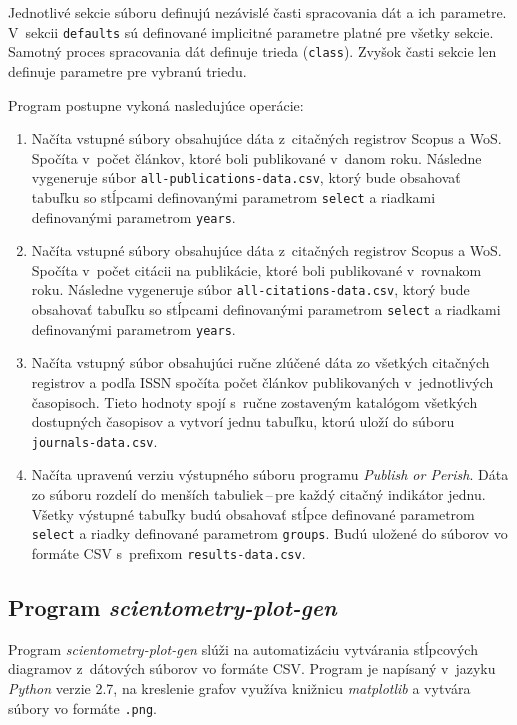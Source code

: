 Jednotlivé sekcie súboru definujú nezávislé časti spracovania dát a ich
parametre. V~sekcii \verb|defaults| sú definované implicitné parametre platné
pre všetky sekcie. Samotný proces spracovania dát definuje trieda
(\verb|class|). Zvyšok časti sekcie len definuje parametre pre vybranú triedu.

Program postupne vykoná nasledujúce operácie:

\begin{enumerate}
\item Načíta vstupné súbory obsahujúce dáta z~citačných registrov Scopus a
  WoS. Spočíta v~počet článkov, ktoré boli publikované v~danom roku. Následne
  vygeneruje súbor \verb|all-publications-data.csv|, ktorý bude obsahovať
  tabuľku so stĺpcami definovanými parametrom \verb|select| a riadkami
  definovanými parametrom \verb|years|.
\item Načíta vstupné súbory obsahujúce dáta z~citačných registrov Scopus a
  WoS. Spočíta v~počet citácii na publikácie, ktoré boli publikované v~rovnakom
  roku. Následne vygeneruje súbor \verb|all-citations-data.csv|, ktorý bude
  obsahovať tabuľku so stĺpcami definovanými parametrom \verb|select| a riadkami
  definovanými parametrom \verb|years|.
\item Načíta vstupný súbor obsahujúci ručne zlúčené dáta zo všetkých citačných
  registrov a podľa ISSN spočíta počet článkov publikovaných v~jednotlivých
  časopisoch. Tieto hodnoty spojí s~ručne zostaveným katalógom všetkých
  dostupných časopisov a vytvorí jednu tabuľku, ktorú uloží do súboru
  \verb|journals-data.csv|.
\item Načíta upravenú verziu výstupného súboru programu \emph{Publish or Perish}.
  Dáta zo súboru rozdelí do menších tabuliek\,--\,pre každý citačný indikátor
  jednu. Všetky výstupné tabuľky budú obsahovať stĺpce definované parametrom
  \verb|select| a riadky definované parametrom \verb|groups|. Budú uložené do
  súborov vo formáte CSV s~prefixom \verb|results-data.csv|.
\end{enumerate}


\subsection*{Program \emph{scientometry-plot-gen}}

Program \emph{scientometry-plot-gen} slúži na automatizáciu vytvárania
stĺpcových diagramov z~dátových súborov vo formáte CSV. Program je napísaný
v~jazyku \emph{Python} verzie 2.7, na kreslenie grafov využíva knižnicu
\emph{matplotlib} a vytvára súbory vo formáte \texttt{.png}.

